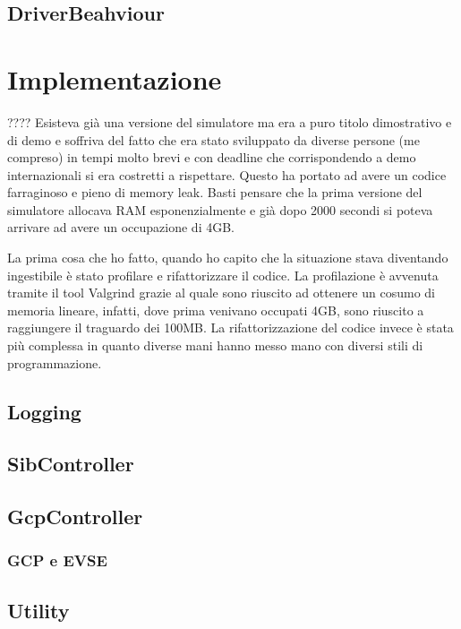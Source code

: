 \subsection{DriverBeahviour}

\section{Implementazione}

????
Esisteva già una versione del simulatore ma era a puro titolo dimostrativo e di demo e soffriva del fatto che era stato sviluppato da diverse persone (me compreso) in tempi molto brevi e con deadline che corrispondendo a demo internazionali si era costretti a rispettare. Questo ha portato ad avere un codice farraginoso e pieno di memory leak. Basti pensare che la prima versione del simulatore allocava RAM esponenzialmente e già dopo 2000 secondi si poteva arrivare ad avere un occupazione di 4GB.

La prima cosa che ho fatto, quando ho capito che la situazione stava diventando ingestibile è stato profilare e rifattorizzare il codice. La profilazione è avvenuta tramite il tool Valgrind grazie al quale sono riuscito ad ottenere un cosumo di memoria lineare, infatti, dove prima venivano occupati 4GB, sono riuscito a raggiungere il traguardo dei 100MB. La rifattorizzazione del codice invece è stata più complessa in quanto diverse mani hanno messo mano con diversi stili di programmazione. 

\subsection{Logging}

\subsection{SibController}

\subsection{GcpController}

\subsubsection{GCP e EVSE}

\subsection{Utility}

